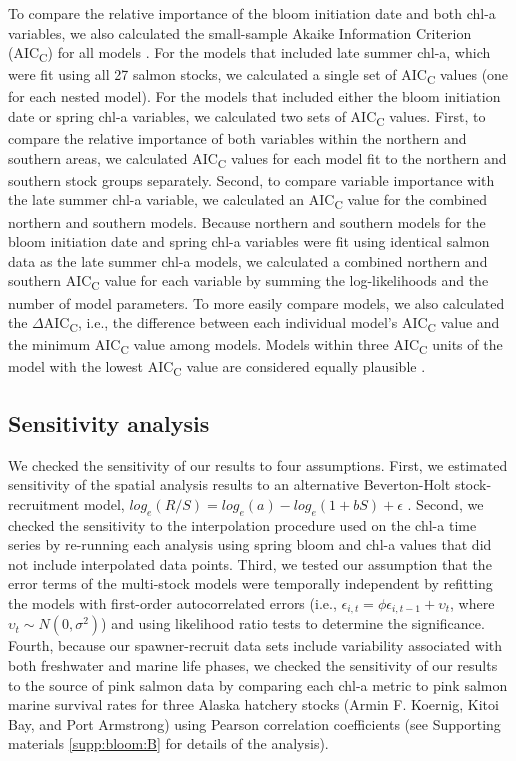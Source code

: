 To compare the relative importance of the bloom initiation date and both chl-a
variables, we also calculated the small-sample Akaike Information Criterion
(AIC\textsubscript{C}) for all models \citep{Hurvich1989a, Burnham2002a}. For
the models that included late summer chl-a, which were fit using all 27 salmon
stocks, we calculated a single set of AIC\textsubscript{C} values (one for each
nested model).  For the models that included either the bloom initiation date or
spring chl-a variables, we calculated two sets of AIC\textsubscript{C} values.
First, to compare the relative importance of both variables within the northern
and southern areas, we calculated AIC\textsubscript{C} values for each model fit
to the northern and southern stock groups separately.  Second, to compare
variable importance with the late summer chl-a variable, we calculated an
AIC\textsubscript{C} value for the combined northern and southern models.
Because northern and southern models for the bloom initiation date and spring
chl-a variables were fit using identical salmon data as the late summer chl-a
models, we calculated a combined northern and southern AIC\textsubscript{C}
value for each variable by summing the log-likelihoods and the number of model
parameters. To more easily compare models, we also calculated the
\(\Delta\)AIC\textsubscript{C}, i.e., the difference between each individual
model's AIC\textsubscript{C} value and the minimum AIC\textsubscript{C} value
among models. Models within three AIC\textsubscript{C} units of the model with
the lowest AIC\textsubscript{C} value are considered equally plausible
\citep{Burnham2002a}.


\subsection{Sensitivity analysis}

We checked the sensitivity of our results to four assumptions. First, we
estimated sensitivity of the spatial analysis results to an alternative
Beverton-Holt stock-recruitment model, $log_{e}(R/S) = log_{e}(a) - log_{e}(1 +
bS) + \epsilon$ \citep{Beverton1957a}.  Second, we checked the sensitivity to
the interpolation procedure used on the chl-a time series by re-running each
analysis using spring bloom and chl-a values that did not include interpolated
data points. Third, we tested our assumption that the error terms of the
multi-stock models were temporally independent by refitting the models with
first-order autocorrelated errors (i.e., \(\epsilon_{i,t} = \phi\epsilon_{i,t-1}
+ \upsilon_t\), where \(\upsilon_t \sim N(0, \sigma^2)\)) and using likelihood
ratio tests to determine the significance. Fourth, because our spawner-recruit
data sets include variability associated with both freshwater and marine life
phases, we checked the sensitivity of our results to the source of pink salmon
data by comparing each chl-a metric to pink salmon marine survival rates for
three Alaska hatchery stocks (Armin F. Koernig, Kitoi Bay, and Port Armstrong)
using Pearson correlation coefficients (see Supporting materials
\ref{supp:bloom:B} for details of the analysis).



